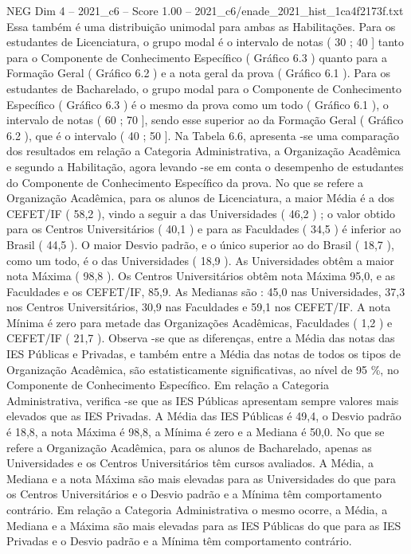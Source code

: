 \begin{textsample}{NEG Dim 4 – 2021\_c6 – Score 1.00 – 2021\_c6/enade\_2021\_hist\_1ca4f2173f.txt}
Essa também é uma distribuição unimodal para ambas as Habilitações.
Para os estudantes de Licenciatura, o grupo modal é o intervalo de notas ( 30 ; 40 ] tanto para o Componente de Conhecimento Específico ( Gráfico 6.3 ) quanto para a Formação Geral ( Gráfico 6.2 ) e a nota geral da prova ( Gráfico 6.1 ).
Para os estudantes de Bacharelado, o grupo modal para o Componente de Conhecimento Específico ( Gráfico 6.3 ) é o mesmo da prova como um todo ( Gráfico 6.1 ), o intervalo de notas ( 60 ; 70 ], sendo esse superior ao da Formação Geral ( Gráfico 6.2 ), que é o intervalo ( 40 ; 50 ].
Na Tabela 6.6, apresenta -se uma comparação dos resultados em relação a Categoria Administrativa, a Organização Acadêmica e segundo a Habilitação, agora levando -se em conta o desempenho de estudantes do Componente de Conhecimento Específico da prova.
No que se refere a Organização Acadêmica, para os alunos de Licenciatura, a maior Média é a dos CEFET/IF ( 58,2 ), vindo a seguir a das Universidades ( 46,2 ) ; o valor obtido para os Centros Universitários ( 40,1 ) e para as Faculdades ( 34,5 ) é inferior ao Brasil ( 44,5 ).
O maior Desvio padrão, e o único superior ao do Brasil ( 18,7 ), como um todo, é o das Universidades ( 18,9 ).
As Universidades obtêm a maior nota Máxima ( 98,8 ).
Os Centros Universitários obtêm nota Máxima 95,0, e as Faculdades e os CEFET/IF, 85,9.
As Medianas são : 45,0 nas Universidades, 37,3 nos Centros Universitários, 30,9 nas Faculdades e 59,1 nos CEFET/IF.
A nota Mínima é zero para metade das Organizações Acadêmicas, Faculdades ( 1,2 ) e CEFET/IF ( 21,7 ).
Observa -se que as diferenças, entre a Média das notas das IES Públicas e Privadas, e também entre a Média das notas de todos os tipos de Organização Acadêmica, são estatisticamente significativas, ao nível de 95 \%, no Componente de Conhecimento Específico.
Em relação a Categoria Administrativa, verifica -se que as IES Públicas apresentam sempre valores mais elevados que as IES Privadas.
A Média das IES Públicas é 49,4, o Desvio padrão é 18,8, a nota Máxima é 98,8, a Mínima é zero e a Mediana é 50,0.
No que se refere a Organização Acadêmica, para os alunos de Bacharelado, apenas as Universidades e os Centros Universitários têm cursos avaliados.
A Média, a Mediana e a nota Máxima são mais elevadas para as Universidades do que para os Centros Universitários e o Desvio padrão e a Mínima têm comportamento contrário.
Em relação a Categoria Administrativa o mesmo ocorre, a Média, a Mediana e a Máxima são mais elevadas para as IES Públicas do que para as IES Privadas e o Desvio padrão e a Mínima têm comportamento contrário.

\end{textsample}
